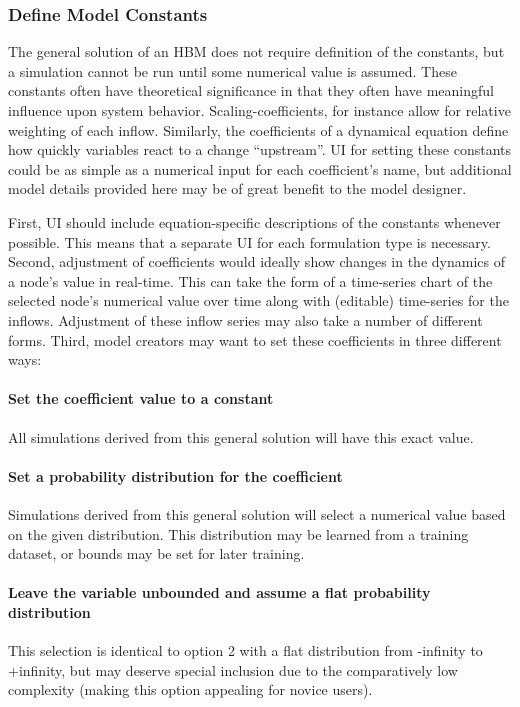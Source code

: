 \documentclass[runningheads,a4paper]{llncs}
\begin{document}
\subsubsection{Define Model Constants}
The general solution of an HBM does not require definition of the constants, but a simulation cannot be run until some numerical value is assumed. 
These constants often have theoretical significance in that they often have meaningful influence upon system behavior. 
Scaling-coefficients, for instance allow for relative weighting of each inflow. 
Similarly, the coefficients of a dynamical equation define how quickly variables react to a change ``upstream''.
UI for setting these constants could be as simple as a numerical input for each coefficient's name, but additional model details provided here may be of great benefit to the model designer. 

First, UI should include equation-specific descriptions of the constants whenever possible. This means that a separate UI for each formulation type is necessary. 
Second, adjustment of coefficients would ideally show changes in the dynamics of a node's value in real-time. 
This can take the form of a time-series chart of the selected node's numerical value over time along with (editable) time-series for the inflows. 
Adjustment of these inflow series may also take a number of different forms. 
Third, model creators may want to set these coefficients in three different ways: 
\paragraph{Set the coefficient value to a constant}
All simulations derived from this general solution will have this exact value.

\paragraph{Set a probability distribution for the coefficient}
Simulations derived from this general solution will select a numerical value based on the given distribution. 
This distribution may be learned from a training dataset, or bounds may be set for later training. 

\paragraph{Leave the variable unbounded and assume a flat probability distribution}
This selection is identical to option 2 with a flat distribution from -infinity to +infinity, but may deserve special inclusion due to the comparatively low complexity (making this option appealing for novice users).
\end{document}
